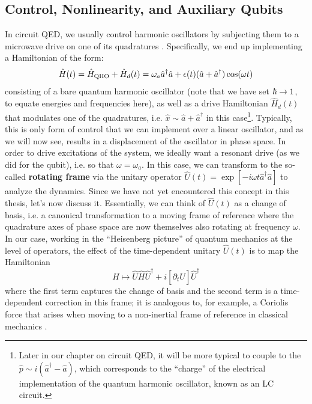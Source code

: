 \subsection{Control, Nonlinearity, and Auxiliary Qubits\label{sec:2_control_nonlinearity_drive}}
In circuit QED, we usually control harmonic oscillators by subjecting them to a microwave drive on one of its quadratures \cite{manenti2023quantum}. Specifically, we end up implementing a Hamiltonian of the form:
\begin{equation}
    \hat{H}(t) = \hat{H}_{\rm QHO} + \hat{H}_d(t) = \omega_a \hat{a}^\dagger \hat{a} + \epsilon(t)(\hat{a} + \hat{a}^\dagger)\cos(\omega t)
    \label{eq:2_oscillator_drive}
\end{equation}
consisting of a bare quantum harmonic oscillator (note that we have set $\hbar \to 1$, to equate energies and frequencies here), as well as a drive Hamiltonian $\hat{H}_d(t)$ that modulates one of the quadratures, i.e. $\hat{x} \sim \hat{a} + \hat{a}^\dagger$ in this case\footnote{Later in our chapter on circuit QED, it will be more typical to couple to the $\hat{p} \sim i(\hat{a}^\dagger - \hat{a})$, which corresponds to the ``charge'' of the electrical implementation of the quantum harmonic oscillator, known as an LC circuit.}. Typically, this is only form of control that we can implement over a linear oscillator, and as we will now see, results in a displacement of the oscillator in phase space. In order to drive excitations of the system, we ideally want a resonant drive (as we did for the qubit), i.e. so that $\omega = \omega_a$. In this case, we can transform to the so-called \textbf{rotating frame} via the unitary operator $\hat{U}(t) = \exp[-i\omega t\hat{a}^\dagger \hat{a}]$ to analyze the dynamics. Since we have not yet encountered this concept in this thesis, let's now discuss it. Essentially, we can think of $\hat{U}(t)$ as a change of basis, i.e. a canonical transformation to a moving frame of reference where the quadrature axes of phase space are now themselves also rotating at frequency $\omega$. In our case, working in the ``Heisenberg picture'' of quantum mechanics at the level of operators, the effect of the time-dependent unitary $\hat{U}(t)$ is to map the Hamiltonian
\begin{equation}
    \hat{H} \mapsto \hat{U} \hat{H} \hat{U}^\dagger + i[\partial_t \hat{U}]\hat{U}^\dagger
\end{equation}
where the first term captures the change of basis and the second term is a time-dependent correction in this frame; it is analogous to, for example, a Coriolis force that arises when moving to a non-inertial frame of reference in classical mechanics \cite{goldstein-classical-mechanics}. 

